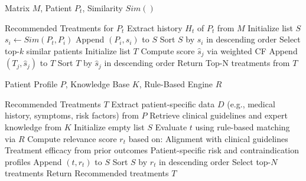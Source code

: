 \documentclass[conference]{IEEEtran}
\newcommand{\REQUIRE}{\item[\textbf{Require:}]}
\newcommand{\ENSURE}{\item[\textbf{Ensure:}]}
\begin{document}
\vspace{1em}

\begin{algorithm}[H]
\caption{Collaborative-filtering based treatment recommendation}
\label{alg:collaborative}
\begin{algorithmic}[1]
\REQUIRE Matrix $M$, Patient $P_t$, Similarity $Sim()$ \ENSURE Recommended Treatments for $P_t$
\STATE Extract history $H_t$ of $P_t$ from $M$
\STATE Initialize list $S$
    \STATE $s_i \gets Sim(P_t, P_i)$
    \STATE Append $(P_i, s_i)$ to $S$
\ENDFOR
\STATE Sort $S$ by $s_i$ in descending order
\STATE Select top-$k$ similar patients
\STATE Initialize list $T$
    \STATE Compute score $\hat{s}_j$ via weighted CF
    \STATE Append $(T_j, \hat{s}_j)$ to $T$
\ENDFOR
\STATE Sort $T$ by $\hat{s}_j$ in descending order
\STATE Return Top-N treatments from $T$
\end{algorithmic}
\end{algorithm}

\vspace{1em}

\begin{algorithm}[H]
\caption{Knowledge-based filtering treatment recommendation}
\label{alg:knowledge}
\begin{algorithmic}[1]
\REQUIRE Patient Profile $P$, Knowledge Base $K$, Rule-Based Engine $R$ \ENSURE Recommended Treatments $T$
\STATE Extract patient-specific data $D$ (e.g., medical history, symptoms, risk factors) from $P$
\STATE Retrieve clinical guidelines and expert knowledge from $K$
\STATE Initialize empty list $S$
    \STATE Evaluate $t$ using rule-based matching via $R$
    \STATE Compute relevance score $r_t$ based on:
    \STATE \quad Alignment with clinical guidelines
    \STATE \quad Treatment efficacy from prior outcomes
    \STATE \quad Patient-specific risk and contraindication profiles
    \STATE Append $(t, r_t)$ to $S$
\ENDFOR
\STATE Sort $S$ by $r_t$ in descending order
\STATE Select top-$N$ treatments
\STATE Return Recommended treatments $T$
\end{algorithmic}
\end{algorithm}

\vspace{1em}
\end{document}
